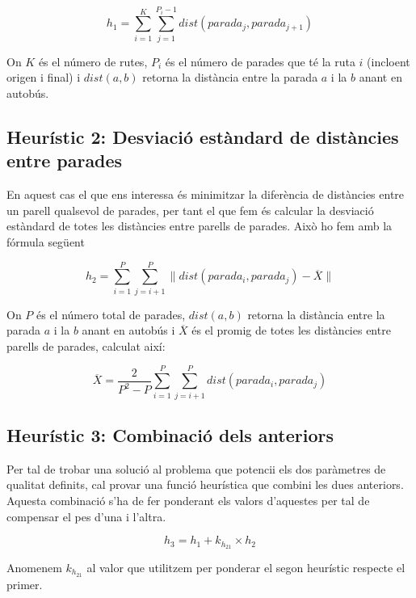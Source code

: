 \begin{center}
	\large
	\[
		h_1 = \sum_{i=1}^{K} \sum_{j=1}^{P_{i} - 1} dist(parada_j, parada_{j+1})
	\]
\end{center}

On $K$ és el número de rutes, $P_i$ és el número de parades que té la ruta $i$ (incloent origen i final) i $dist(a, b)$ retorna la distància entre la parada $a$ i la $b$ anant en autobús.


\subsection{Heurístic 2: Desviació estàndard de distàncies entre parades} %
\label{sub:heuristic2}

En aquest cas el que ens interessa és minimitzar la diferència de distàncies entre un parell qualsevol de parades, per tant el que fem és calcular la desviació estàndard de totes les distàncies entre parells de parades. Això ho fem amb la fórmula següent

\begin{center}
	\large
	\[
		h_2 = \sum_{i=1}^{P} \sum_{j=i+1}^{P} \| dist(parada_i, parada_j) - \overline{X} \|
	\]
\end{center}

On $P$ és el número total de parades, $dist(a, b)$ retorna la distància entre la parada $a$ i la $b$ anant en autobús i $\overline{X}$ és el promig de totes les distàncies entre parells de parades, calculat així:

\begin{center}
	\large
	\[
		\overline{X} = \dfrac{2}{P^2 - P} \sum_{i=1}^{P} \sum_{j=i+1}^{P} dist(parada_i, parada_j)
	\]
\end{center}



\subsection{Heurístic 3: Combinació dels anteriors} %
\label{sub:heuristic3}

Per tal de trobar una solució al problema que potencii els dos paràmetres de qualitat definits, cal provar una funció heurística que combini les dues anteriors. Aquesta combinació s'ha de fer ponderant els valors d'aquestes per tal de compensar el pes d'una i l'altra.

\begin{center}
	\large
	\[
		h_3 = h_1 + k_{h_{21}} \times h_2
	\]
\end{center}

Anomenem $k_{h_{21}}$ al valor que utilitzem per ponderar el segon heurístic respecte el primer.

